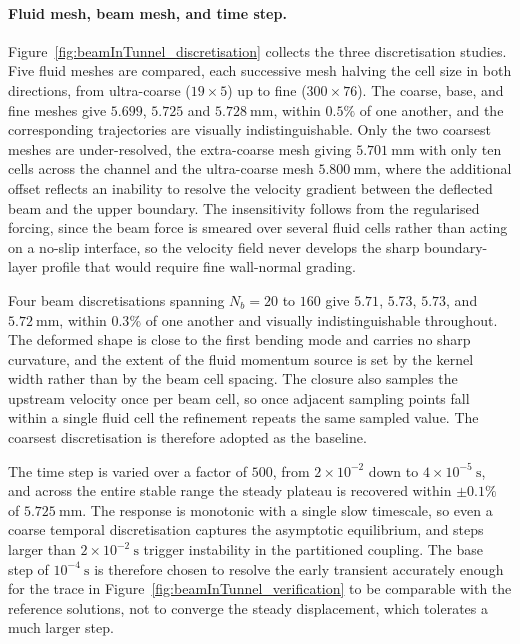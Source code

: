 \paragraph{Fluid mesh, beam mesh, and time step.}
Figure~\ref{fig:beamInTunnel_discretisation} collects the three discretisation studies. Five fluid meshes are compared, each successive mesh halving the cell size in both directions, from ultra-coarse ($19 \times 5$) up to fine ($300 \times 76$). The coarse, base, and fine meshes give $5.699$, $5.725$ and $5.728~\mathrm{mm}$, within $0.5\%$ of one another, and the corresponding trajectories are visually indistinguishable. Only the two coarsest meshes are under-resolved, the extra-coarse mesh giving $5.701~\mathrm{mm}$ with only ten cells across the channel and the ultra-coarse mesh $5.800~\mathrm{mm}$, where the additional offset reflects an inability to resolve the velocity gradient between the deflected beam and the upper boundary. The insensitivity follows from the regularised forcing, since the beam force is smeared over several fluid cells rather than acting on a no-slip interface, so the velocity field never develops the sharp boundary-layer profile that would require fine wall-normal grading.

\noindent
Four beam discretisations spanning $N_b = 20$ to $160$ give $5.71$, $5.73$, $5.73$, and $5.72~\mathrm{mm}$, within $0.3\%$ of one another and visually indistinguishable throughout. The deformed shape is close to the first bending mode and carries no sharp curvature, and the extent of the fluid momentum source is set by the kernel width rather than by the beam cell spacing. The closure also samples the upstream velocity once per beam cell, so once adjacent sampling points fall within a single fluid cell the refinement repeats the same sampled value. The coarsest discretisation is therefore adopted as the baseline.

\noindent
The time step is varied over a factor of $500$, from $2\times10^{-2}$ down to $4\times10^{-5}~\mathrm{s}$, and across the entire stable range the steady plateau is recovered within $\pm 0.1\%$ of $5.725~\mathrm{mm}$. The response is monotonic with a single slow timescale, so even a coarse temporal discretisation captures the asymptotic equilibrium, and steps larger than $2\times10^{-2}~\mathrm{s}$ trigger instability in the partitioned coupling. The base step of $10^{-4}~\mathrm{s}$ is therefore chosen to resolve the early transient accurately enough for the trace in Figure~\ref{fig:beamInTunnel_verification} to be comparable with the reference solutions, not to converge the steady displacement, which tolerates a much larger step.

